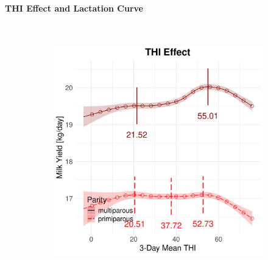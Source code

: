 \paragraph{THI Effect and Lactation Curve} \quad \\
\begin{figure}[H]
    \centering
    \begin{subfigure}[b]{0.45\textwidth}
        \centering
        \includegraphics[width=\textwidth]{thesis/figures/models/milk/before2010/ob_milk_before2010/ob_milk_before2010_marginal_thi_milk_combined.png}
    \end{subfigure}
    \hspace{0.05\textwidth} %
    \begin{subfigure}[b]{0.45\textwidth}
        \centering

\end{subfigure}
\end{figure}
